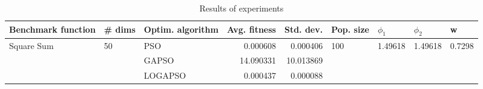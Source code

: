 \begin{table}
\centering
\caption{Results of experiments}
\begin{tabular}{lllrrllll}
\toprule
         Benchmark function &             \# dims & Optim. algorithm &  Avg. fitness &  Std. dev. &            Pop. size &               $\phi_{1}$ &               $\phi_{2}$ &                       w \\
\midrule
\multirow{3}{*}{Square Sum} & \multirow{3}{*}{50} &              PSO &      0.000608 &   0.000406 & \multirow{3}{*}{100} & \multirow{3}{*}{1.49618} & \multirow{3}{*}{1.49618} & \multirow{3}{*}{0.7298} \\
                            &                     &            GAPSO &     14.090331 &  10.013869 &                      &                          &                          &                         \\
                            &                     &          LOGAPSO &      0.000437 &   0.000088 &                      &                          &                          &                         \\
\bottomrule
\end{tabular}
\end{table}
